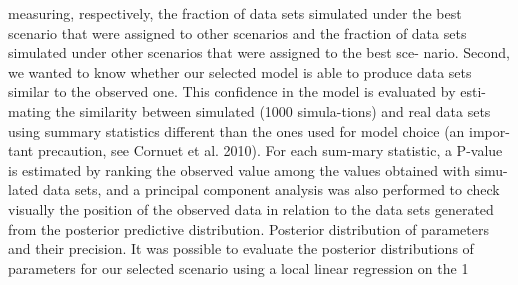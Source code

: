 measuring, respectively, the fraction of data sets simulated under the best scenario that were assigned to other scenarios and the fraction of data sets simulated under other scenarios that were assigned to the best sce- nario. Second, we wanted to know whether our selected model is able to produce data sets similar to the observed one. This confidence in the model is evaluated by esti-mating the similarity between simulated (1000 simula-tions) and real data sets using summary statistics different than the ones used for model choice (an impor-tant precaution, see Cornuet et al. 2010). For each sum-mary statistic, a P-value is estimated by ranking the observed value among the values obtained with simu-lated data sets, and a principal component analysis was also performed to check visually the position of the observed data in relation to the data sets generated from the posterior predictive distribution. Posterior distribution of parameters and their precision. It was possible to evaluate the posterior distributions of parameters for our selected scenario using a local linear regression on the 1%
